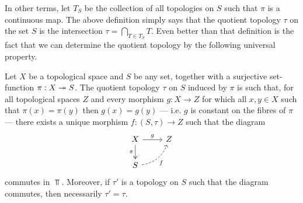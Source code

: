 In other terms, let \(T_S\) be the collection of all topologies on \(S\) such
that \(\pi\) is a continuous map. The above definition simply says that the
quotient topology \(\tau\) on the set \(S\) is the intersection
\(\tau = \bigcap_{T \in T_S}T\). Even better than that definition is the
fact that we can determine the quotient topology by the following universal
property.

\begin{theorem}
    \label{thm:universal-property-quotient-topology}
    Let \(X\) be a topological space and \(S\) be any set, together with a
    surjective set-function \(\pi: X \twoheadrightarrow S\). The quotient topology \(\tau\)
    on \(S\) induced by \(\pi\) is such that, for all topological spaces \(Z\) and
    every morphism \(g: X \to Z\) for which all \(x, y \in X\) such that
    \(\pi(x) = \pi(y)\) then \(g(x) = g(y)\) --- i.e. \(g\) is constant on the
    fibres of \(\pi\) --- there exists a unique morphism
    \(f: (S, \tau) \to Z\) such that the diagram
    \[
        \begin{tikzcd}
            X \ar[r, "g"] \ar[d, two heads, swap, "\pi"] &Z\\
            S \ar[ur, swap, bend right, dashed, "f"]
        \end{tikzcd}
    \]
    commutes in \(\Top\). Moreover, if \(\tau'\) is a topology on \(S\) such
    that the diagram commutes, then necessarily \(\tau' = \tau\).
\end{theorem}

